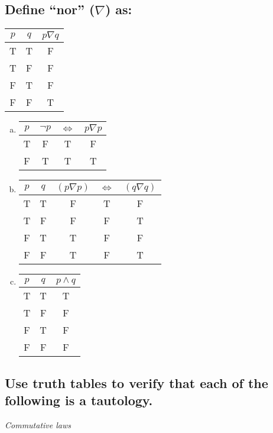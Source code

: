 \documentclass[12pt]{scrartcl} %
\begin{document}
\subsection{Define ``nor'' ($\nabla$) as:}

\begin{center}
\begin{tabular}{*{2}{c}|*{1}{c}}$p$&$q$&$p \nabla q$\\
\hline
T&T&F\\
T&F&F\\
F&T&F\\
F&F&T\\
\end{tabular}
\end{center}

\begin{enumerate}[(a)]
	\item \begin{tabular}{*{1}{c}|*{3}{c}}$p$&$\neg p$&$\iff$&$p \nabla p$\\
			\hline	
			T&F&T&F\\
			F&T&T&T\\
			\end{tabular}	
	\item \begin{tabular}{*{2}{c}|*{3}{c}}$p$&$q$&$(p \nabla p)$&$\iff$&$(q \nabla q)$\\
			\hline
			T&T&F&T&F\\
			T&F&F&F&T\\
			F&T&T&F&F\\
			F&F&T&F&T\\
		  \end{tabular}
		  
	\item \begin{tabular}{*{2}{c}|*{1}{c}}$p$&$q$&$p \land q$\\
			\hline
			T&T&T\\
			T&F&F\\
			F&T&F\\
			F&F&F\\
		  \end{tabular}
\end{enumerate}

\subsection{Use truth tables to verify that each of the following is a tautology.}

\emph{Commutative laws}
\end{document}
